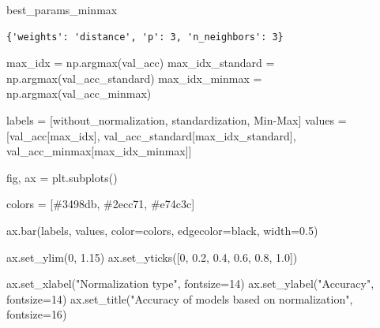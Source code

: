 \documentclass[
  letterpaper,
  DIV=11,
  numbers=noendperiod]{scrartcl}
\newenvironment{Shaded}{\begin{snugshade}}{\end{snugshade}}
\newcommand{\DecValTok}[1]{\textcolor[rgb]{0.68,0.00,0.00}{#1}}
\newcommand{\FloatTok}[1]{\textcolor[rgb]{0.68,0.00,0.00}{#1}}
\newcommand{\NormalTok}[1]{\textcolor[rgb]{0.00,0.23,0.31}{#1}}
\newcommand{\OperatorTok}[1]{\textcolor[rgb]{0.37,0.37,0.37}{#1}}
\newcommand{\StringTok}[1]{\textcolor[rgb]{0.13,0.47,0.30}{#1}}
\begin{document}
\begin{Shaded}
\begin{Highlighting}[]
\NormalTok{best\_params\_minmax}
\end{Highlighting}
\end{Shaded}

\begin{verbatim}
{'weights': 'distance', 'p': 3, 'n_neighbors': 3}
\end{verbatim}

\begin{Shaded}
\begin{Highlighting}[]
\NormalTok{max\_idx }\OperatorTok{=}\NormalTok{ np.argmax(val\_acc)}
\NormalTok{max\_idx\_standard }\OperatorTok{=}\NormalTok{ np.argmax(val\_acc\_standard)}
\NormalTok{max\_idx\_minmax }\OperatorTok{=}\NormalTok{ np.argmax(val\_acc\_minmax)}

\NormalTok{labels }\OperatorTok{=}\NormalTok{ [}\StringTok{\textquotesingle{}without\_normalization\textquotesingle{}}\NormalTok{, }\StringTok{\textquotesingle{}standardization\textquotesingle{}}\NormalTok{, }\StringTok{\textquotesingle{}Min{-}Max\textquotesingle{}}\NormalTok{]}
\NormalTok{values }\OperatorTok{=}\NormalTok{ [val\_acc[max\_idx], val\_acc\_standard[max\_idx\_standard], val\_acc\_minmax[max\_idx\_minmax]] }

\NormalTok{fig, ax }\OperatorTok{=}\NormalTok{ plt.subplots()}

\NormalTok{colors }\OperatorTok{=}\NormalTok{ [}\StringTok{\textquotesingle{}\#3498db\textquotesingle{}}\NormalTok{, }\StringTok{\textquotesingle{}\#2ecc71\textquotesingle{}}\NormalTok{, }\StringTok{\textquotesingle{}\#e74c3c\textquotesingle{}}\NormalTok{]}

\NormalTok{ax.bar(labels, values, color}\OperatorTok{=}\NormalTok{colors, edgecolor}\OperatorTok{=}\StringTok{\textquotesingle{}black\textquotesingle{}}\NormalTok{, width}\OperatorTok{=}\FloatTok{0.5}\NormalTok{)}

\NormalTok{ax.set\_ylim(}\DecValTok{0}\NormalTok{, }\FloatTok{1.15}\NormalTok{)}
\NormalTok{ax.set\_yticks([}\DecValTok{0}\NormalTok{, }\FloatTok{0.2}\NormalTok{, }\FloatTok{0.4}\NormalTok{, }\FloatTok{0.6}\NormalTok{, }\FloatTok{0.8}\NormalTok{, }\FloatTok{1.0}\NormalTok{])}

\NormalTok{ax.set\_xlabel(}\StringTok{"Normalization type"}\NormalTok{, fontsize}\OperatorTok{=}\DecValTok{14}\NormalTok{)}
\NormalTok{ax.set\_ylabel(}\StringTok{"Accuracy"}\NormalTok{, fontsize}\OperatorTok{=}\DecValTok{14}\NormalTok{)}
\NormalTok{ax.set\_title(}\StringTok{"Accuracy of models based on normalization"}\NormalTok{, fontsize}\OperatorTok{=}\DecValTok{16}\NormalTok{)}


\end{Highlighting}
\end{Shaded}
\end{document}
